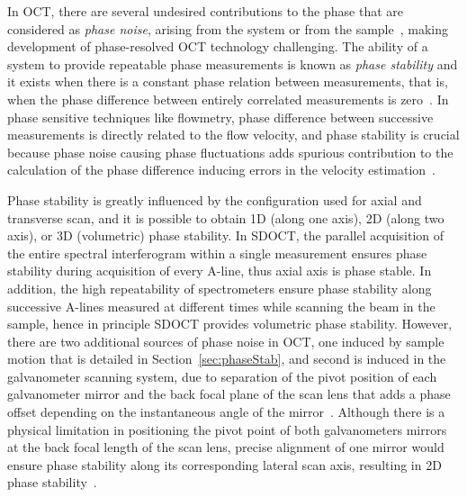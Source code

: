In OCT, there are several undesired contributions to the phase that are considered as \textit{phase noise}, arising from the system or from the sample~\cite{Vakoc2005_Phaseresolved, Shemonski2014_Stability}, making development of phase-resolved OCT technology challenging. The ability of a system to provide repeatable phase measurements is known as \textit{phase stability} and it exists when there is a constant phase relation between measurements, that is, when the phase difference between entirely correlated measurements is zero~\cite{Shemonski2014_Stability}. In phase sensitive techniques like flowmetry, phase difference between successive measurements is directly related to the flow velocity, and phase stability is crucial because phase noise causing phase fluctuations adds spurious contribution to the calculation of the phase difference inducing errors in the velocity estimation~\cite{White2003_vivo}.

Phase stability is greatly influenced by the configuration used for axial and transverse scan, and it is possible to obtain 1D (along one axis), 2D (along two axis), or 3D (volumetric) phase stability. In SDOCT, the parallel acquisition of the entire spectral interferogram within a single measurement ensures phase stability during acquisition of every A-line, thus axial axis is phase stable. In addition, the high repeatability of spectrometers ensure phase stability along successive A-lines measured at different times while scanning the beam in the sample, hence in principle SDOCT provides volumetric phase stability. However, there are two additional sources of phase noise in OCT, one induced by sample motion that is detailed in Section~\ref{sec:phaseStab}, and second is induced in the galvanometer scanning system, due to separation of the pivot position of each galvanometer mirror and the back focal plane of the scan lens that adds a phase offset depending on the instantaneous angle of the mirror~\cite{Shemonski2014_Stability}. Although there is a physical limitation in positioning the pivot point of both galvanometers mirrors at the back focal length of the scan lens, precise alignment of one mirror would ensure phase stability along its corresponding lateral scan axis, resulting in 2D phase stability~\cite{Vakoc2009_Statistical}.

